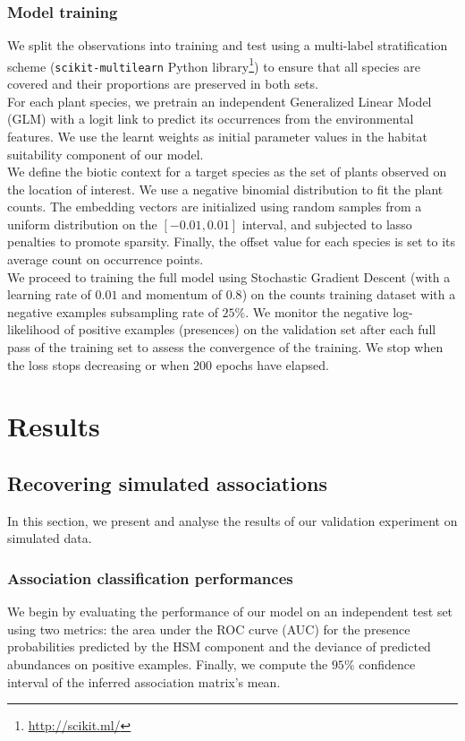 \documentclass[10pt,a4paper]{article}
\begin{document}
\subsubsection{Model training}
We split the observations into training and test using a multi-label stratification scheme (\texttt{scikit-multilearn} Python library\footnote{\url{http://scikit.ml/}}) to ensure that all species are covered and their proportions are preserved in both sets. \\

For each plant species, we pretrain an independent Generalized Linear Model (GLM) with a logit link to predict its occurrences from the environmental features. We use the learnt weights as initial parameter values in the habitat suitability component of our model. \\

We define the biotic context for a target species as the set of plants observed on the location of interest. We use a negative binomial distribution to fit the plant counts. The embedding vectors are initialized using random samples from a uniform distribution on the $[-0.01,0.01]$ interval, and subjected to lasso penalties to promote sparsity. Finally, the offset value for each species is set to its average count on occurrence points.\\

We proceed to training the full model using Stochastic Gradient Descent (with a learning rate of $0.01$ and momentum of $0.8$) on the counts training dataset with a negative examples subsampling rate of $25\%$. We monitor the negative log-likelihood of positive examples (presences) on the validation set after each full pass of the training set to assess the convergence of the training. We stop when the loss stops decreasing or when $200$ epochs have elapsed.

\section{Results}
\subsection{Recovering simulated associations}
In this section, we present and analyse the results of our validation experiment on simulated data.

\subsubsection{Association classification performances}
We begin by evaluating the performance of our model on an independent test set using two metrics: the area under the ROC curve (AUC) for the presence probabilities predicted by the HSM component and the deviance of predicted abundances on positive examples. Finally, we compute the $95\%$ confidence interval of the inferred association matrix's mean. \\
\end{document}
